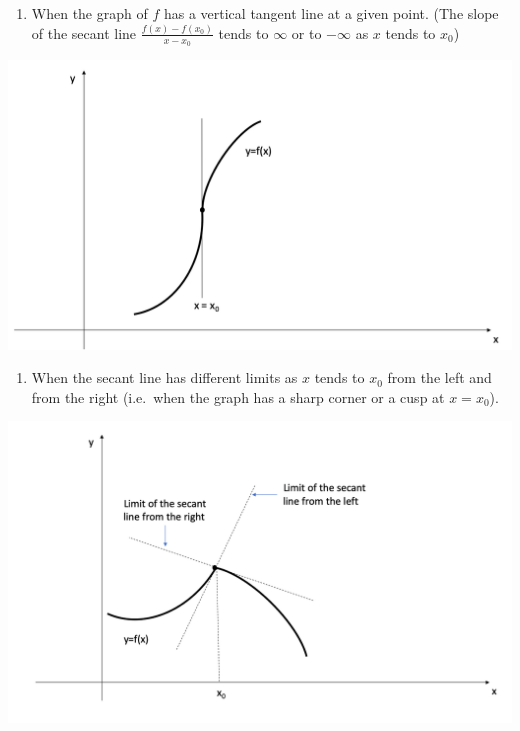 \documentclass[]{book}
\providecommand{\tightlist}{%
  \setlength{\itemsep}{0pt}\setlength{\parskip}{0pt}}
\begin{document}
\newpage

\begin{enumerate}
\def\labelenumi{\arabic{enumi}.}
\tightlist
\item
  When the graph of \(f\) has a vertical tangent line at a given point. (The slope of the secant line \(\frac{f(x) - f(x_0)}{x-x_0}\) tends to \(\infty\) or to \(-\infty\) as \(x\) tends to \(x_0\))
\end{enumerate}

\begin{center}\includegraphics[width=1\linewidth]{figure/5Derivatives-6} \end{center}

\begin{enumerate}
\def\labelenumi{\arabic{enumi}.}
\setcounter{enumi}{1}
\tightlist
\item
  When the secant line has different limits as \(x\) tends to \(x_0\) from the left and from the right (i.e.~when the graph has a sharp corner or a cusp at \(x=x_0\)).
\end{enumerate}

\includegraphics[width=1\linewidth]{figure/5Derivatives-7}
\end{document}
